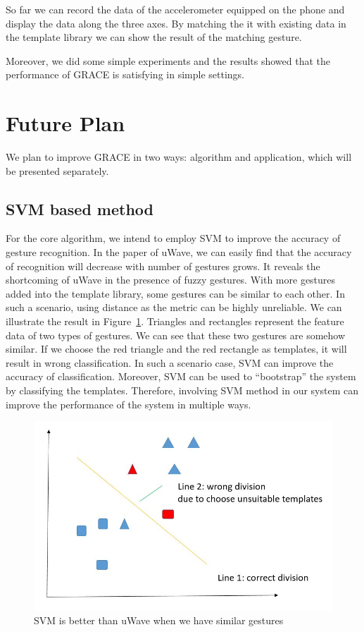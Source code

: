 \documentclass{acm_proc_article-sp}
\begin{document}
So far we can record the data of the accelerometer equipped on the phone and display the data along the three axes. By matching the it with existing data in the template library we can show the result of the matching gesture.

Moreover, we did some simple experiments and the results showed that the performance of GRACE is satisfying in simple settings.

\section{Future Plan}
\label{futureplan}
We plan to improve GRACE in two ways: algorithm and application, which will be presented separately.  
\subsection{SVM based method}
For the core algorithm, we intend to employ SVM to improve the accuracy of gesture recognition. In the paper of uWave, we can easily find that the accuracy of recognition will decrease with number of gestures grows. It reveals the shortcoming of uWave in the presence of fuzzy gestures. With more gestures added into the template library, some gestures can be similar to each other. In such a scenario, using distance as the metric can be highly unreliable. We can illustrate the result in Figure~\ref{SVMuWave}. Triangles and rectangles represent the feature data of two types of gestures. We can see that these two gestures are somehow similar. If we choose the red triangle and the red rectangle as templates, it will result in wrong classification. In such a scenario case, SVM can improve the accuracy of classification. Moreover, SVM can be used to ``bootstrap'' the system by classifying the templates. Therefore, involving SVM method in our system can improve the performance of the system in multiple ways.\begin{figure}
  \centering
  \includegraphics[width=0.8\linewidth]{SVM_better_than_uWave.JPG}
  \caption{SVM is better than uWave when we have similar gestures}
  \label{SVMuWave}
\end{figure} 
\end{document}
